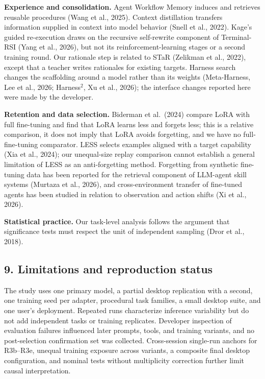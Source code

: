 \documentclass[
  10pt,
]{article}
\begin{document}
\textbf{Experience and consolidation.} Agent Workflow Memory induces and
retrieves reusable procedures (Wang et al., 2025). Context distillation
transfers information supplied in context into model behavior (Snell et
al., 2022). Kage's guided re-execution draws on the recursive
self-rewrite component of Terminal-RSI (Yang et al., 2026), but not its
reinforcement-learning stages or a second training round. Our rationale
step is related to STaR (Zelikman et al., 2022), except that a teacher
writes rationales for existing targets. Harness search changes the
scaffolding around a model rather than its weights (Meta-Harness, Lee et
al., 2026; Harness\(^2\), Xu et al., 2026); the interface changes
reported here were made by the developer.

\textbf{Retention and data selection.} Biderman et al.~(2024) compare
LoRA with full fine-tuning and find that LoRA learns less and forgets
less; this is a relative comparison, it does not imply that LoRA avoids
forgetting, and we have no full-fine-tuning comparator. LESS selects
examples aligned with a target capability (Xia et al., 2024); our
unequal-size replay comparison cannot establish a general limitation of
LESS as an anti-forgetting method. Forgetting from synthetic fine-tuning
data has been reported for the retrieval component of LLM-agent skill
systems (Murtaza et al., 2026), and cross-environment transfer of
fine-tuned agents has been studied in relation to observation and action
shifts (Xi et al., 2026).

\textbf{Statistical practice.} Our task-level analysis follows the
argument that significance tests must respect the unit of independent
sampling (Dror et al., 2018).

\subsection{9. Limitations and reproduction
status}\label{limitations-and-reproduction-status}

The study uses one primary model, a partial desktop replication with a
second, one training seed per adapter, procedural task families, a small
desktop suite, and one user's deployment. Repeated runs characterize
inference variability but do not add independent tasks or training
replicates. Developer inspection of evaluation failures influenced later
prompts, tools, and training variants, and no post-selection
confirmation set was collected. Cross-session single-run anchors for
R3b--R3e, unequal training exposure across variants, a composite final
desktop configuration, and nominal tests without multiplicity correction
further limit causal interpretation.
\end{document}

